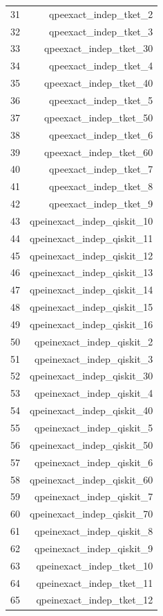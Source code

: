 \begin{longtable}{lr}
31 & qpeexact\_indep\_tket\_2 \\
32 & qpeexact\_indep\_tket\_3 \\
33 & qpeexact\_indep\_tket\_30 \\
34 & qpeexact\_indep\_tket\_4 \\
35 & qpeexact\_indep\_tket\_40 \\
36 & qpeexact\_indep\_tket\_5 \\
37 & qpeexact\_indep\_tket\_50 \\
38 & qpeexact\_indep\_tket\_6 \\
39 & qpeexact\_indep\_tket\_60 \\
40 & qpeexact\_indep\_tket\_7 \\
41 & qpeexact\_indep\_tket\_8 \\
42 & qpeexact\_indep\_tket\_9 \\
43 & qpeinexact\_indep\_qiskit\_10 \\
44 & qpeinexact\_indep\_qiskit\_11 \\
45 & qpeinexact\_indep\_qiskit\_12 \\
46 & qpeinexact\_indep\_qiskit\_13 \\
47 & qpeinexact\_indep\_qiskit\_14 \\
48 & qpeinexact\_indep\_qiskit\_15 \\
49 & qpeinexact\_indep\_qiskit\_16 \\
50 & qpeinexact\_indep\_qiskit\_2 \\
51 & qpeinexact\_indep\_qiskit\_3 \\
52 & qpeinexact\_indep\_qiskit\_30 \\
53 & qpeinexact\_indep\_qiskit\_4 \\
54 & qpeinexact\_indep\_qiskit\_40 \\
55 & qpeinexact\_indep\_qiskit\_5 \\
56 & qpeinexact\_indep\_qiskit\_50 \\
57 & qpeinexact\_indep\_qiskit\_6 \\
58 & qpeinexact\_indep\_qiskit\_60 \\
59 & qpeinexact\_indep\_qiskit\_7 \\
60 & qpeinexact\_indep\_qiskit\_70 \\
61 & qpeinexact\_indep\_qiskit\_8 \\
62 & qpeinexact\_indep\_qiskit\_9 \\
63 & qpeinexact\_indep\_tket\_10 \\
64 & qpeinexact\_indep\_tket\_11 \\
65 & qpeinexact\_indep\_tket\_12 \\

\end{longtable}

